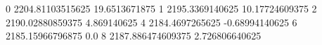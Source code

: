 0 2204.81103515625 19.6513671875
1 2195.3369140625 10.17724609375
2 2190.02880859375 4.869140625
4 2184.4697265625 -0.68994140625
6 2185.15966796875 0.0
8 2187.886474609375 2.726806640625
